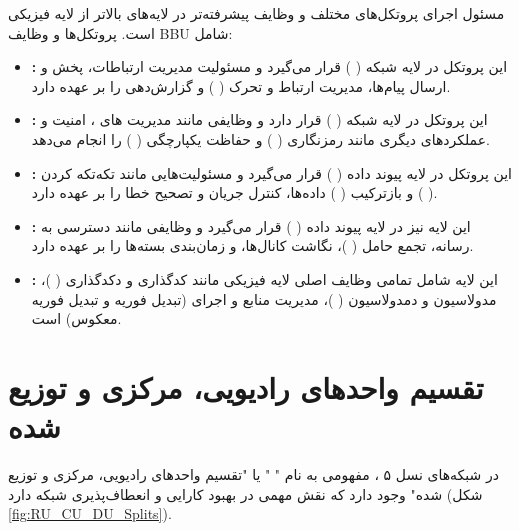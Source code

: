 \documentclass[landscape, 12pt]{report}
\begin{document}
     
        مسئول اجرای پروتکل‌های مختلف و وظایف پیشرفته‌تر در لایه‌های بالاتر از لایه فیزیکی است. پروتکل‌ها و وظایف BBU شامل:
\begin{itemize}
\item
\textbf{
:}
این پروتکل در لایه شبکه (
) قرار می‌گیرد و مسئولیت مدیریت ارتباطات، پخش و ارسال پیام‌ها، مدیریت ارتباط و تحرک (
) و گزارش‌دهی را بر عهده دارد.
\item
 \textbf{
 :}
 این پروتکل در لایه شبکه (
 ) قرار دارد و وظایفی مانند مدیریت
   های
     ، امنیت و عملکردهای دیگری مانند رمزنگاری (
     ) و حفاظت یکپارچگی (
     ) را انجام می‌دهد.
\item
\textbf{
:}
این پروتکل در لایه پیوند داده (
) قرار می‌گیرد و مسئولیت‌هایی مانند تکه‌تکه کردن (
) و بازترکیب  (
) داده‌ها، کنترل جریان و تصحیح خطا را بر عهده دارد.
\item
\textbf{
:}
 این لایه نیز در لایه پیوند داده (
 ) قرار می‌گیرد و وظایفی مانند دسترسی به رسانه، تجمع حامل (
 )، نگاشت کانال‌ها،
   و زمان‌بندی بسته‌ها را بر عهده دارد.
\item
\textbf{
:}
این لایه شامل تمامی وظایف اصلی لایه فیزیکی مانند کدگذاری و دکدگذاری (
)، مدولاسیون و دمدولاسیون (
 )، مدیریت منابع و اجرای
  (تبدیل فوریه و تبدیل فوریه معکوس) است.
\end{itemize}

      
\chapter*{تقسیم واحدهای رادیویی، مرکزی و توزیع شده}   
در شبکه‌های نسل ۵ ، مفهومی به نام "
" یا "تقسیم واحدهای رادیویی، مرکزی و توزیع شده" وجود دارد که نقش مهمی در بهبود کارایی و انعطاف‌پذیری شبکه دارد (شکل \ref{fig:RU_CU_DU_Splits}).
\end{document}
